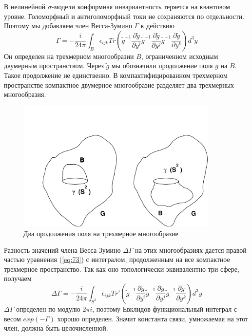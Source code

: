 \documentclass[a4paper,12pt]{article}
\theoremstyle{definition} \newtheorem{Def}{Definition}
\begin{document}
В нелинейной $\sigma$-модели конформная инвариантность теряется на квантовом уровне.
Голоморфный и антиголоморфный токи не сохраняются по отдельности.
Поэтому мы добавляем член Весса-Зумино $\Gamma$ к действию
\begin{equation}
  \label{eq:73}
\Gamma= - \frac{i }{24\pi} \int_{B}\epsilon_{ijk} Tr\left(
    \tilde g^{-1}\frac{\partial \tilde g}{\partial y^i}
      \tilde g^{-1}\frac{\partial \tilde g}{\partial y^j}
      \tilde g^{-1}\frac{\partial \tilde g}{\partial y^k}\right) d^3y
\end{equation}
Он определен на трехмерном многообразии $B$, ограниченном исходным двумерным пространством.
Через $\tilde{g}$ мы обозначили продолжение поля $g$ на $B$. Такое продолжение не единственно. В
компактифицированном трехмерном пространстве компактное двумерное многообразие разделяет два
трехмерных многообразия.
\begin{figure}[h]
 \centering
  \includegraphics[width=100mm]{fig3.pdf}  
  \caption{Два продолжения поля на трехмерное многообразие}
  \label{fig:1}
\end{figure}

Разность значений члена Весса-Зумино $\Delta\Gamma$ на этих многообразиях
дается правой частью уравнения (\ref{eq:73}) с интегралом, продолженным на все компактное трехмерное
пространство. Так как оно топологически эквивалентно три-сфере, получаем
\begin{equation}
  \label{eq:75} \Delta\Gamma= - \frac{i }{24\pi} \int_{S^3}\epsilon_{ijk} Tr'\left( \tilde
g^{-1}\frac{\partial \tilde g}{\partial y^i} \tilde g^{-1}\frac{\partial \tilde g}{\partial y^j}
\tilde g^{-1}\frac{\partial \tilde g}{\partial y^k}\right) d^3y
\end{equation}
$\Delta\Gamma$ определен по модулю $2\pi i$, поэтому Евклидов функциональный интеграл
с весом $exp(-\Gamma)$ хорошо определен. Значит константа связи, умножаемая на этот член, должна
быть целочисленной.
\end{document}
